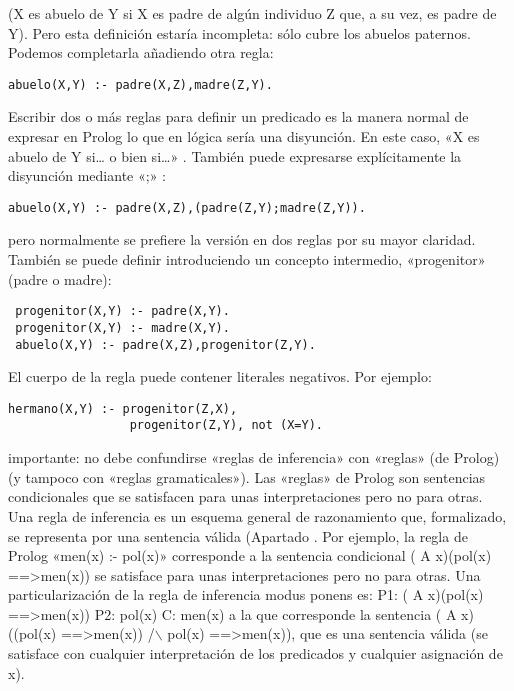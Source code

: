 \documentclass[11pt]{article}
\begin{document}
(X es abuelo de Y si X es padre de algún individuo Z que, a su vez, es
padre de Y).  Pero esta definición estaría incompleta: sólo cubre los
abuelos paternos. Podemos completarla añadiendo otra regla:

\begin{verbatim}
abuelo(X,Y) :- padre(X,Z),madre(Z,Y).
\end{verbatim}

Escribir dos o más reglas para definir un predicado es la manera
normal de expresar en Prolog lo que en lógica sería una disyunción. En
este caso, «X es abuelo de Y si\ldots{} o bien si\ldots{}» . También puede
expresarse explícitamente la disyunción mediante «;» :

\begin{verbatim}
abuelo(X,Y) :- padre(X,Z),(padre(Z,Y);madre(Z,Y)).
\end{verbatim}

pero normalmente se prefiere la versión en dos reglas por su mayor
claridad.  También se puede definir introduciendo un concepto
intermedio, «progenitor» (padre o madre):

\begin{verbatim}
 progenitor(X,Y) :- padre(X,Y).  
 progenitor(X,Y) :- madre(X,Y).  
 abuelo(X,Y) :- padre(X,Z),progenitor(Z,Y).
\end{verbatim}

El cuerpo de la regla puede contener literales negativos. Por ejemplo:

\begin{verbatim}
hermano(X,Y) :- progenitor(Z,X),  
                 progenitor(Z,Y), not (X=Y).
\end{verbatim}


importante: no debe confundirse «reglas de inferencia» con «reglas»
(de Prolog) (y tampoco con «reglas gramaticales»). Las «reglas» de
Prolog son sentencias condicionales que se satisfacen para unas
interpretaciones pero no para otras. Una regla de inferencia es un
esquema general de razonamiento que, formalizado, se representa por
una sentencia válida (Apartado . Por ejemplo, la regla de Prolog
«men(x) :- pol(x)» corresponde a la sentencia condicional ( A
x)(pol(x) ==>men(x)) se satisface para unas interpretaciones pero no
para otras. Una particularización de la regla de inferencia modus
ponens es: P1: ( A x)(pol(x) ==>men(x)) P2: pol(x) C: men(x) a la que
corresponde la sentencia ( A x)((pol(x) ==>men(x)) /$\backslash$ pol(x)
==>men(x)), que es una sentencia válida (se satisface con cualquier
interpretación de los predicados y cualquier asignación de x).
\end{document}
